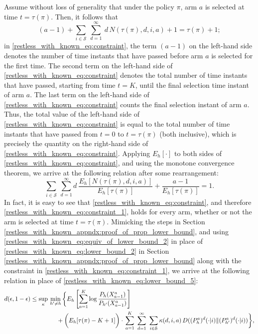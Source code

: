 Assume without loss of generality that under the policy $\pi$, arm $a$ is selected at time $t=\tau(\pi)$. Then, it follows that 
\begin{equation}
	(a-1)+\sum\limits_{i\in\mathcal{S}}~\sum\limits_{d=1}^{\infty}~d\,N(\tau(\pi),d,i,a) + 1 = \tau(\pi)+1;\label{restless_with_known_eq:constraint}
\end{equation}
in \eqref{restless_with_known_eq:constraint}, the term $(a-1)$ on the left-hand side denotes the number of time instants that have passed before arm $a$ is selected for the first time. The second term on the left-hand side of \eqref{restless_with_known_eq:constraint} denotes the total number of time instants that have passed, starting from time $t=K$, until the final selection time instant of arm $a$. The last term on the left-hand side of \eqref{restless_with_known_eq:constraint} counts the final selection instant of arm $a$. Thus, the total value of the left-hand side of \eqref{restless_with_known_eq:constraint} is equal to the total number of time instants that have passed from $t=0$ to $t=\tau(\pi)$ (both inclusive), which is precisely the quantity on the right-hand side of \eqref{restless_with_known_eq:constraint}. Applying $E_h[\cdot]$ to both sides of \eqref{restless_with_known_eq:constraint}, and using the monotone convergence theorem, we arrive at the following relation after some rearrangement:
\begin{equation}
	\sum\limits_{i\in\mathcal{S}}~\sum\limits_{d=1}^{\infty} d~\frac{E_h[N(\tau(\pi),d,i,a)]}{E_h[\tau(\pi)]}+\frac{a-1}{E_h[\tau(\pi)]}=1.\label{restless_with_known_eq:constraint_1}
\end{equation}
In fact, it is easy to see that \eqref{restless_with_known_eq:constraint}, and therefore \eqref{restless_with_known_eq:constraint_1}, holds for every arm, whether or not the arm is selected at time $t=\tau(\pi)$. Mimicking the steps in Section \ref{restless_with_known_appndx:proof_of_prop_lower_bound}, and using  \eqref{restless_with_known_eq:equiv_of_lower_bound_2} in place of \eqref{restless_with_known_eq:lower_bound_2} in Section \ref{restless_with_known_appndx:proof_of_prop_lower_bound} along with the constraint in \eqref{restless_with_known_eq:constraint_1}, we arrive at the following relation in place of \eqref{restless_with_known_eq:lower_bound_5}:
\begin{align}
	d(\epsilon,1-\epsilon)&\leq \sup\limits_{\kappa}\,\min\limits_{h'\neq h}\bigg\lbrace E_h\left[\sum\limits_{a=1}^{K}\log\frac{P_h(X_{a-1}^{a})}{P_{h'}(X_{a-1}^{a})}\right]\nonumber\\
	&\hspace{1.5cm}+\bigg(E_h[\tau(\pi)-K+1]\bigg)\cdot\,\sum\limits_{a=1}^{K}~\sum\limits_{d=1}^{\infty}~\sum\limits_{i\in\mathcal{S}}\kappa(d,i,a)\, D((P_h^a)^{d}(\cdot|i)\|(P_{h'}^a)^{d}(\cdot|i))\bigg\rbrace,\label{restless_with_known_eq:equiv_lower_bound_5}
\end{align}
